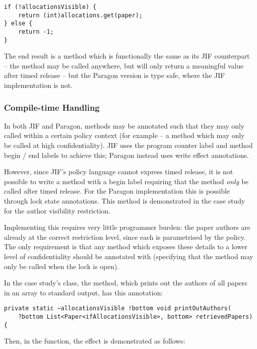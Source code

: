 \begin{verbatim}
if (!allocationsVisible) {
	return (int)allocations.get(paper);
} else {
	return -1;
}
\end{verbatim}

The end result is a method which is functionally the same as its JIF counterpart -- the method may be called anywhere, but will only return a meaningful value after timed release -- but the Paragon version is type safe, where the JIF implementation is not.

\subsubsection{Compile-time Handling}

In both JIF and Paragon, methods may be annotated such that they may only called within a certain policy context (for example -- a method which may only be called at high confidentiality). JIF uses the program counter label and method begin / end labels to achieve this; Paragon instead uses write effect annotations.

However, since JIF's policy language cannot express timed release, it is not possible to write a method with a begin label requiring that the method \textit{only} be called after timed release. For the Paragon implementation this is possible through lock state annotations. This method is demonstrated in the case study for the author visibility restriction.

Implementing this requires very little programmer burden: the paper authors are already at the correct restriction level, since each  is parametrised by the  policy. The only requirement is that any method which exposes these details to a lower level of confidentiality should be annotated with  (specifying that the method may only be called when the  lock is open).

In the case study's  class, the  method, which prints out the authors of all papers in an array to standard output, has this annotation:

\begin{verbatim}
private static ~allocationsVisible !bottom void printOutAuthors(
	?bottom List<Paper<ifAllocationsVisible>, bottom> retrievedPapers) {
\end{verbatim}

\newpage

Then, in the  function, the effect is demonstrated as follows:

